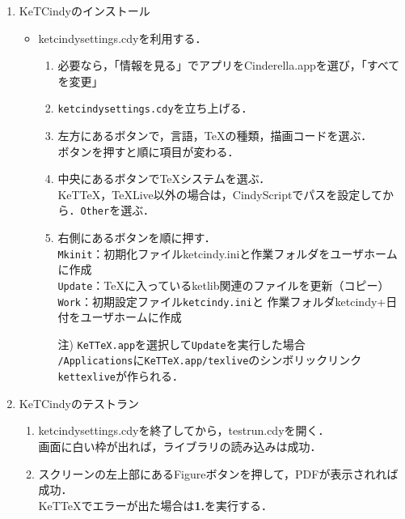 \documentclass{ujarticle}
\begin{document}
\begin{enumerate}[\bf\large 1.]
\item KeTCindyのインストール
\begin{itemize}
\item ketcindysettings.cdyを利用する．
\begin{enumerate}[(1)]
\item 必要なら，「情報を見る」でアプリをCinderella.appを選び，「すべてを変更」
\item \verb|ketcindysettings.cdy|を立ち上げる．
\item 左方にあるボタンで，言語，TeXの種類，描画コードを選ぶ．\\
\hspace*{10mm}ボタンを押すと順に項目が変わる．
\item 中央にあるボタンでTeXシステムを選ぶ．\\
\hspace*{10mm}KeTTeX，TeXLive以外の場合は，CindyScriptでパスを設定してから．\verb|Other|を選ぶ．
\item 右側にあるボタンを順に押す．\\
\hspace*{5mm}\verb|Mkinit|：初期化ファイルketcindy.iniと作業フォルダをユーザホームに作成\\
\hspace*{5mm}\verb|Update|：TeXに入っているketlib関連のファイルを更新（コピー）\\
\hspace*{5mm}\verb|Work|：初期設定ファイル\verb|ketcindy.ini|と
作業フォルダketcindy+日付をユーザホームに作成
\item[注)]\verb|KeTTeX.app|を選択して\verb|Update|を実行した場合\\
\hspace*{5mm}\verb|/Applications|に\verb|KeTTeX.app/texlive|のシンボリックリンク\verb|kettexlive|が作られる．
\end{enumerate}
\end{itemize}

  \item KeTCindyのテストラン
    \begin{enumerate}[(1)]
    \item ketcindysettings.cdyを終了してから，testrun.cdyを開く．\\
      \hspace*{10mm}画面に白い枠が出れば，ライブラリの読み込みは成功．
    \item スクリーンの左上部にあるFigureボタンを押して，PDFが表示されれば成功．\\
\hspace*{10mm}KeTTeXでエラーが出た場合は{\bf 1.}を実行する．
\end{enumerate}


\end{enumerate}
\end{document}
